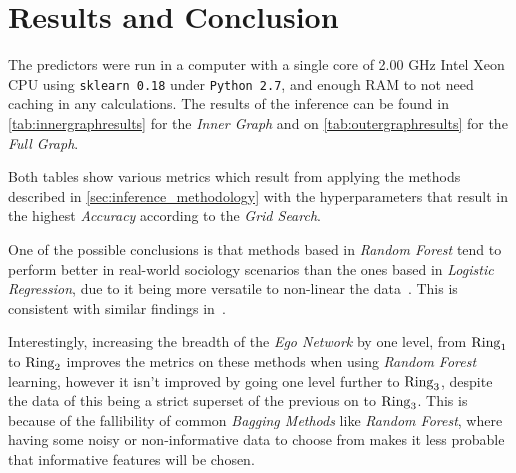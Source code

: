 \section{Results and Conclusion}
\label{sec:results}


The predictors were run in a computer with a single core of 2.00 GHz Intel Xeon CPU using \texttt{sklearn 0.18} under \texttt{Python 2.7}, and enough RAM to not need caching in any calculations. The results of the inference can be found in \cref{tab:innergraphresults} for the \emph{Inner Graph} and on \cref{tab:outergraphresults} for the \emph{Full Graph}.


Both tables show various metrics which result from applying the methods described in \cref{sec:inference_methodology} with the hyperparameters that result in the highest \emph{Accuracy} according to the \emph{Grid Search}.

One of the possible conclusions is that methods based in \emph{Random Forest} tend to perform better in real-world sociology scenarios than the ones based in \emph{Logistic Regression}, due to it being more versatile to non-linear the data~\cite{logisticvsdecision}. This is consistent with similar findings in~\cite{muchlinski2016}.

Interestingly, increasing the breadth of the \emph{Ego Network} by one level, from $\operatorname{Ring}_1$ to $\operatorname{Ring}_2$ improves the metrics on these methods when using \emph{Random Forest} learning, however it isn't improved by going one level further to $\operatorname{Ring}_3$, despite the data of this being a strict superset of the previous on to $\operatorname{Ring}_3$. This is because of the fallibility of common \emph{Bagging Methods} like \emph{Random Forest}, where having some noisy or non-informative data to choose from makes it less probable that informative features will be chosen.

